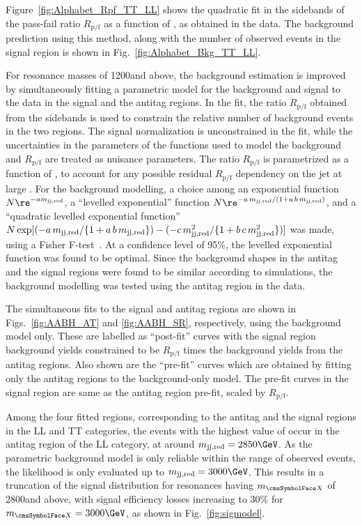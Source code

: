 Figure~\ref{fig:Alphabet_Rpf_TT_LL} shows the quadratic fit in the
\mjone sidebands of the pass-fail ratio $R_\text{p/f}$ as a function of
\mjone, as obtained in the data. The background prediction using this
method, along with the number of observed events in the signal region
is shown in Fig.~\ref{fig:Alphabet_Bkg_TT_LL}.

For resonance masses of 1200\GeV and above, the background estimation is
improved by simultaneously fitting a parametric model for the
background and signal to the data in the signal and the antitag
regions. In the fit, the ratio $R_\text{p/f}$ obtained from the sidebands is used to constrain the relative number of background events in the two regions. The signal normalization is unconstrained in
the fit, while the uncertainties in the parameters of the functions
used to model the background and $R_\text{p/f}$ are treated as nuisance
parameters.
The ratio $R_\text{p/f}$
is parametrized as a function of \mjjs, to account for any possible
residual $R_\text{p/f}$ dependency on the jet \pt at large \mjjs.
For the background modelling, a choice among an exponential function $N \re^{-a\mjjs}$, a ``levelled exponential'' function $N \re^{-a\,\mjjs/(1 + a\, b\, \mjjs)}$, and a ``quadratic levelled exponential function'' $N \exp[({-a\,m_{\text{jj,red}}}/\{1 + a\, b\, m_{\text{jj,red}}\}) - ({-c\,m_{\text{jj,red}}^{2}}/\{1 + b\, c\, m_{\text{jj,red}}^{2}\} )]$ was made, using a Fisher F-test~\cite{Fisher}. At a confidence level of 95\%, the levelled exponential function was found to be optimal.
Since the background shapes in the antitag and the signal regions were found to be similar according to simulations, the background modelling was tested using the antitag region in the data.

The simultaneous fits to the signal and antitag regions are shown in Figs.~\ref{fig:AABH_AT} and \ref{fig:AABH_SR}, respectively, using the background model only. These are labelled as ``post-fit'' curves with the signal region background yields constrained to be $R_\text{p/f}$ times the background yields from the antitag regions. Also shown are the ``pre-fit'' curves which are obtained by fitting only the antitag regions to the background-only model. The pre-fit curves in the signal region are same as the antitag region pre-fit, scaled by $R_\text{p/f}$.

Among the four fitted regions, corresponding to the antitag and the signal regions in the
LL and TT categories, the events with the highest value of \mjjs
occur in the antitag region of the LL category, at around
$\mjjs = 2850\GeV$.
As the parametric background model is only reliable within the range
of observed events, the likelihood is only evaluated up to $\mjjs = 3000\GeV$.
This results in a truncation of the signal distribution for resonances having $\mx$ of 2800\GeV and above, with signal efficiency losses increasing to 30\% for $\mx = 3000\GeV$, as shown in Fig.~\ref{fig:sigmodel}.

